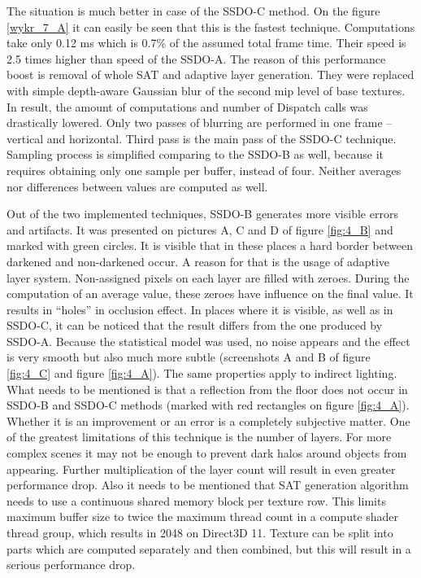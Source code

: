 \documentclass[10pt,journal,compsoc,twoside]{IEEEtran}
\begin{document}
The situation is much better in case of the SSDO-C method. On the figure \ref{wykr_7_A} it can easily be seen that this is the fastest technique. Computations take only 0.12 ms which is 0.7\% of the assumed total frame time. Their speed is 2.5 times higher than speed of the SSDO-A. The reason of this performance boost is removal of whole SAT and adaptive layer generation. They were replaced with simple depth-aware Gaussian blur of the second mip level of base textures. In result, the amount of computations and number of Dispatch calls was drastically lowered. Only two passes of blurring are performed in one frame -- vertical and horizontal. Third pass is the main pass of the SSDO-C technique. Sampling process is simplified comparing to the SSDO-B as well, because it requires obtaining only one sample per buffer, instead of four. Neither averages nor differences between values are computed as well.

Out of the two implemented techniques, SSDO-B generates more visible errors and artifacts. It was presented on pictures A, C and D of figure \ref{fig:4_B} and marked with green circles. It is visible that in these places a hard border between darkened and non-darkened occur. A reason for that is the usage of adaptive layer system. Non-assigned pixels on each layer are filled with zeroes. During the computation of an average value, these zeroes have influence on the final value. It results in ``holes'' in occlusion effect. In places where it is visible, as well as in SSDO-C, it can be noticed that the result differs from the one produced by SSDO-A. Because the statistical model was used, no noise appears and the effect is very smooth but also much more subtle (screenshots A and B of figure \ref{fig:4_C} and figure \ref{fig:4_A}). The same properties apply to indirect lighting. What needs to be mentioned is that a reflection from the floor does not occur in SSDO-B and SSDO-C methods (marked with red rectangles on figure \ref{fig:4_A}). Whether it is an improvement or an error is a completely subjective matter. One of the greatest limitations of this technique is the number of layers. For more complex scenes it may not be enough to prevent dark halos around objects from appearing. Further multiplication of the layer count will result in even greater performance drop. Also it needs to be mentioned that SAT generation algorithm needs to use a continuous shared memory block per texture row. This limits maximum buffer size to twice the maximum thread count in a compute shader thread group, which results in 2048 on Direct3D 11. Texture can be split into parts which are computed separately and then combined, but this will result in a serious performance drop.
\end{document}
